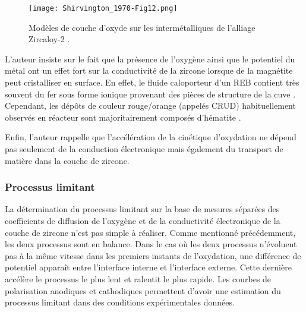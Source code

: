 \begin{refsection}
    
    \begin{figure}[H]
        \centering
        \texttt{[image: Shirvington\_1970-Fig12.png]}
        \caption[Modèles de couche de zircone sur les phases intermétalliques de l'alliage Zircaloy-2.]{Modèles de couche
        d'oxyde sur les intermétalliques de l'alliage Zircaloy-2 \citep{Shirvington1970-1}.}
        \label{fig:shirvington_oxide_structures}
    \end{figure}

    L'auteur insiste sur le fait que la présence de l'oxygène ainsi que le potentiel du métal ont un effet fort sur la
    conductivité de la zircone lorsque de la magnétite peut cristalliser en surface. En effet, le fluide caloporteur
    d'un REB contient très souvent du fer sous forme ionique provenant des pièces de structure de la cuve
    \citep{IAEA1993, IAEA1998, IAEA2011}. Cependant, les dépôts de couleur rouge/orange (appelés CRUD) habituellement observés en
    réacteur sont majoritairement composés d'hématite \citep{Edsinger2004}.
    
    Enfin, l'auteur rappelle que
    l'accélération de la cinétique d'oxydation ne dépend pas seulement de la conduction électronique mais également du
    transport de matière dans la couche de zircone.      
   
   
   
    \subsubsection{Processus limitant}\label{subsubsec:rate_limiting}
         
    La détermination du processus limitant sur la base de mesures séparées des coefficients de diffusion de l'oxygène et de la
    conductivité électronique de la couche de zircone n'est pas simple à réaliser. Comme mentionné précédemment, les deux
    processus sont en balance. Dans le cas où les deux processus n'évoluent pas à la même vitesse dans les
    premiers instants de l'oxydation, une différence de potentiel apparaît entre l'interface interne et l'interface
    externe. Cette dernière accélère le processus le plus lent et ralentit le plus rapide. Les courbes de polarisation
    anodiques et cathodiques permettent d'avoir une estimation du processus limitant dans des conditions expérimentales
    données.



\end{refsection}
